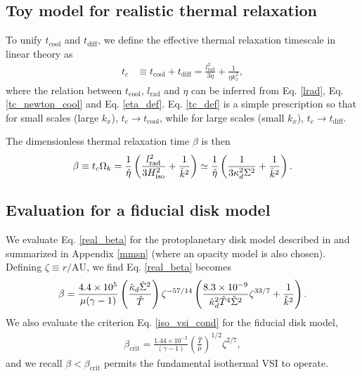 \subsection{Toy model for realistic thermal relaxation}
To unify $t_\mathrm{cool}$ and $t_\mathrm{diff}$, we define the
effective thermal relaxation timescale in linear theory as
\begin{align}\label{tc_def}
  t_c &\equiv t_\mathrm{cool} + t _\mathrm{diff} =
  \frac{l_\mathrm{rad}^2}{3\eta} + \frac{1}{\eta k_x^2},  
\end{align}
where the relation between $t_\mathrm{cool}$, $l_\mathrm{rad}$ and
$\eta$ can be inferred from Eq. \ref{lrad}, Eq. \ref{tc_newton_cool}
and Eq. \ref{eta_def}. Eq. \ref{tc_def} is a simple prescription so
that for small scales (large $k_x$), $t_c\to t_\mathrm{cool}$, while
for large scales (small $k_x$), $t_c\to t_\mathrm{diff}$. 

The dimensionless thermal relaxation time $\beta$ is then
\begin{align}\label{real_beta}
  \beta \equiv t_c\Omega_k =
  \frac{1}{\hat{\eta}}\left(\frac{l_\mathrm{rad}^2}{3H_\mathrm{iso}^2}
    + \frac{1}{\hat{k}^2}\right)  \simeq
  \frac{1}{\hat{\eta}}\left(\frac{1}{3\kappa_d^2\Sigma^2} 
    + \frac{1}{\hat{k}^2}\right).
\end{align}

\subsection{Evaluation for a fiducial disk model}
We evaluate Eq. \ref{real_beta} for the protoplanetary disk model
described in \cite{chiang10} and summarized in Appendix \ref{mmsn}
(where an opacity model is also chosen). Defining $\zeta\equiv
r/\mathrm{AU}$, we find Eq. \ref{real_beta} becomes
\begin{align}\label{beta_mmsn}
\beta =
\frac{4.4\times10^5}{\mu(\gamma-1)}\left(\frac{\hat{\kappa}_d\hat{\Sigma}^2}{\hat{T}}\right)\zeta^{-57/14}\left(\frac{8.3\times10^{-9}}{\hat{\kappa}_d^2\hat{T}^4\hat{\Sigma}^2}\zeta^{33/7}+\frac{1}{\hat{k}^2}\right).  
\end{align}
We also evaluate the criterion Eq. \ref{iso_vsi_cond} for the fiducial
disk model, 
\begin{align}\label{bcrit_mmsn}
  \beta_\mathrm{crit} = \frac{1.44\times10^{-2}}{(\gamma
    -1)}\left(\frac{\hat{T}}{\mu}\right)^{1/2}\zeta^{2/7},
\end{align}
and we recall $\beta < \beta_\mathrm{crit}$ permits the fundamental 
isothermal VSI to operate. 

